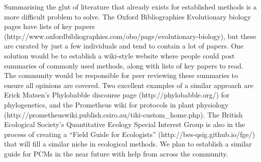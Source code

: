 \documentclass[a4paper,12pt]{article}
\begin{document}
    Summarising the glut of literature that already exists for established methods is a more difficult problem to solve.
    The Oxford Bibliographies Evolutionary biology pages have lists of key papers (http://www.oxfordbibliographies.com/obo/page/evolutionary-biology), but these are curated by just a few individuals and tend to contain a lot of papers. 
    One solution would be to establish a wiki-style website where people could post summaries of commonly used methods, along with lists of key papers to read. 
    The community would be responsible for peer reviewing these summaries to ensure all opinions are covered. 
    Two excellent examples of a similar approach are Erick Matsen's Phylobabble discourse page (http://phylobabble.org/) for phylogenetics, and the Prometheus wiki for protocols in plant physiology (http://prometheuswiki.publish.csiro.au/tiki-custom\_home.php). 
    The British Ecological Society's Quantitative Ecology Special Interest Group is also in the process of creating a ``Field Guide for Ecologists'' (http://bes-qsig.github.io/fge/) that will fill a similar niche in ecological methods.
    We plan to establish a similar guide for PCMs in the near future with help from across the community.\\
\end{document}
